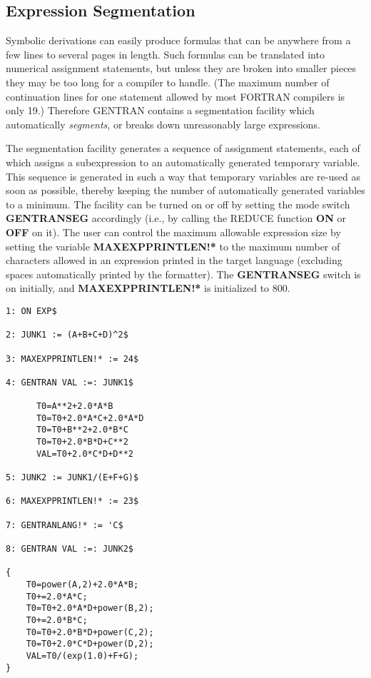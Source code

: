 \subsection{Expression Segmentation}
\label{segmentation} 
Symbolic derivations can easily produce formulas that can be anywhere
from a few lines to several pages in length.  Such formulas
can be translated into numerical assignment statements, but unless they
are broken into smaller pieces they may be too long for a compiler
to handle.  (The maximum number of continuation lines for one statement
allowed by most FORTRAN compilers is only 19.)  Therefore GENTRAN
contains a segmentation facility which automatically {\it segments},
or breaks down unreasonably large expressions.

The segmentation facility generates a sequence of assignment
statements, each of which assigns a subexpression to an automatically
generated temporary variable.  This sequence is generated in such a
way that temporary variables are re-used as soon as possible, thereby
keeping the number of automatically generated variables to a minimum.
The facility can be turned on or off by setting the mode
 switch {\bf GENTRANSEG} accordingly (i.e.,
by calling the REDUCE function {\bf ON} or {\bf OFF} on it).  The user
can control the maximum allowable expression size by setting the
variable {\bf MAXEXPPRINTLEN!*} to the maximum number of characters
allowed in an expression printed in the target language (excluding
spaces automatically printed by the formatter).  The {\bf GENTRANSEG}
switch is on initially, and {\bf MAXEXPPRINTLEN!*} is initialized to
800.
\begin{describe}{\example}
\begin{verbatim}
1: ON EXP$

2: JUNK1 := (A+B+C+D)^2$

3: MAXEXPPRINTLEN!* := 24$

4: GENTRAN VAL :=: JUNK1$

      T0=A**2+2.0*A*B
      T0=T0+2.0*A*C+2.0*A*D
      T0=T0+B**2+2.0*B*C
      T0=T0+2.0*B*D+C**2
      VAL=T0+2.0*C*D+D**2

5: JUNK2 := JUNK1/(E+F+G)$

6: MAXEXPPRINTLEN!* := 23$

7: GENTRANLANG!* := 'C$

8: GENTRAN VAL :=: JUNK2$

{
    T0=power(A,2)+2.0*A*B;
    T0+=2.0*A*C;
    T0=T0+2.0*A*D+power(B,2);
    T0+=2.0*B*C;
    T0=T0+2.0*B*D+power(C,2);
    T0=T0+2.0*C*D+power(D,2);
    VAL=T0/(exp(1.0)+F+G);
}
\end{verbatim}
\end{describe}
